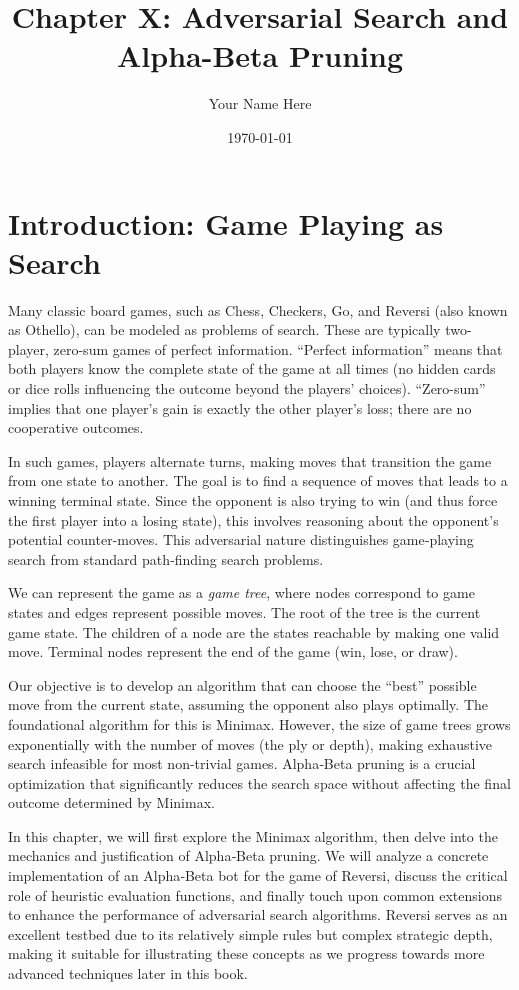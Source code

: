 \documentclass[11pt]{article}
\title{Chapter X: Adversarial Search and Alpha-Beta Pruning}
\author{Your Name Here}
\date{\today}
\begin{document}
\maketitle

\section{Introduction: Game Playing as Search}
Many classic board games, such as Chess, Checkers, Go, and Reversi (also known as Othello), can be modeled as problems of search. These are typically two-player, zero-sum games of perfect information. “Perfect information” means that both players know the complete state of the game at all times (no hidden cards or dice rolls influencing the outcome beyond the players’ choices). “Zero-sum” implies that one player’s gain is exactly the other player’s loss; there are no cooperative outcomes.

In such games, players alternate turns, making moves that transition the game from one state to another. The goal is to find a sequence of moves that leads to a winning terminal state. Since the opponent is also trying to win (and thus force the first player into a losing state), this involves reasoning about the opponent’s potential counter-moves. This adversarial nature distinguishes game‑playing search from standard path‑finding search problems.

We can represent the game as a \textit{game tree}, where nodes correspond to game states and edges represent possible moves. The root of the tree is the current game state. The children of a node are the states reachable by making one valid move. Terminal nodes represent the end of the game (win, lose, or draw).

Our objective is to develop an algorithm that can choose the “best” possible move from the current state, assuming the opponent also plays optimally. The foundational algorithm for this is Minimax. However, the size of game trees grows exponentially with the number of moves (the ply or depth), making exhaustive search infeasible for most non-trivial games. Alpha‑Beta pruning is a crucial optimization that significantly reduces the search space without affecting the final outcome determined by Minimax.

In this chapter, we will first explore the Minimax algorithm, then delve into the mechanics and justification of Alpha‑Beta pruning. We will analyze a concrete implementation of an Alpha‑Beta bot for the game of Reversi, discuss the critical role of heuristic evaluation functions, and finally touch upon common extensions to enhance the performance of adversarial search algorithms. Reversi serves as an excellent testbed due to its relatively simple rules but complex strategic depth, making it suitable for illustrating these concepts as we progress towards more advanced techniques later in this book.
\end{document}
